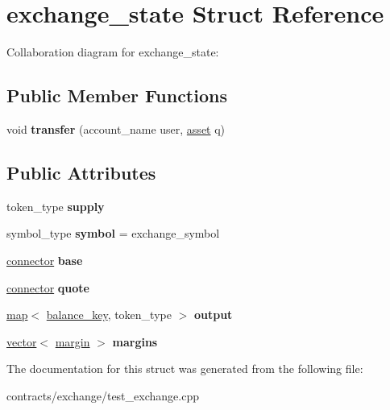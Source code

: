 \hypertarget{structexchange__state}{}\section{exchange\+\_\+state Struct Reference}
\label{structexchange__state}


Collaboration diagram for exchange\+\_\+state\+:
\subsection*{Public Member Functions}
\begin{DoxyCompactItemize}
\item 
\mbox{\label{structexchange__state_a26c01c4025db6afacd62bc111d0ac336}} 
void {\bfseries transfer} (account\+\_\+name user, \mbox{\hyperlink{structasset}{asset}} q)
\end{DoxyCompactItemize}
\subsection*{Public Attributes}
\begin{DoxyCompactItemize}
\item 
\mbox{\label{structexchange__state_a087fded85eba5c014b623b8a9c082500}} 
token\+\_\+type {\bfseries supply}
\item 
\mbox{\label{structexchange__state_a4bc39a718abfa71e931cf0eb92eb7db5}} 
symbol\+\_\+type {\bfseries symbol} = exchange\+\_\+symbol
\item 
\mbox{\label{structexchange__state_ac347aedb89368530adf4740be02822bd}} 
\mbox{\hyperlink{structconnector}{connector}} {\bfseries base}
\item 
\mbox{\label{structexchange__state_a72f37d7232ee04314ea2096e923c6ad5}} 
\mbox{\hyperlink{structconnector}{connector}} {\bfseries quote}
\item 
\mbox{\label{structexchange__state_a0d10eddf213423bf1e5f2af361bc886b}} 
\mbox{\hyperlink{classstd_1_1map}{map}}$<$ \mbox{\hyperlink{structbalance__key}{balance\+\_\+key}}, token\+\_\+type $>$ {\bfseries output}
\item 
\mbox{\label{structexchange__state_a599130b5c9b1809c3bf4efa4f70a7a03}} 
\mbox{\hyperlink{classstd_1_1vector}{vector}}$<$ \mbox{\hyperlink{structmargin}{margin}} $>$ {\bfseries margins}
\end{DoxyCompactItemize}


The documentation for this struct was generated from the following file\+:\begin{DoxyCompactItemize}
\item 
contracts/exchange/test\+\_\+exchange.\+cpp\end{DoxyCompactItemize}
